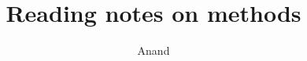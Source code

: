\documentclass[a4paper]{article}
\begin{document}
\title{Reading notes on methods}
\author{Anand}
\maketitle




 
 
\end{document}
